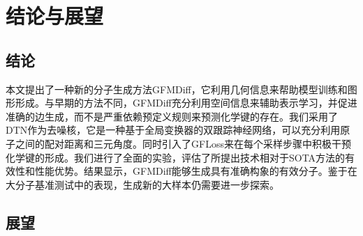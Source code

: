 \chapter{结论与展望}
\label{chap:conclusion}

\section{结论}
本文提出了一种新的分子生成方法GFMDiff，它利用几何信息来帮助模型训练和图形形成。与早期的方法不同，GFMDiff充分利用空间信息来辅助表示学习，并促进准确的边生成，而不是严重依赖预定义规则来预测化学键的存在。我们采用了DTN作为去噪核，它是一种基于全局变换器的双跟踪神经网络，可以充分利用原子之间的配对距离和三元角度。同时引入了GFLoss来在每个采样步骤中积极干预化学键的形成。我们进行了全面的实验，评估了所提出技术相对于SOTA方法的有效性和性能优势。结果显示，GFMDiff能够生成具有准确构象的有效分子。鉴于在大分子基准测试中的表现，生成新的大样本仍需要进一步探索。

\section{展望}